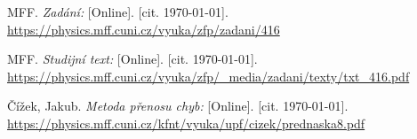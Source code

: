 
\begin{thebibliography}{9}

 MFF. \emph{Zadání:} [Online]. [cit. \today]. \newline \url{https://physics.mff.cuni.cz/vyuka/zfp/zadani/416}

 MFF. \emph{Studijní text:} [Online]. [cit. \today]. \newline \url{https://physics.mff.cuni.cz/vyuka/zfp/_media/zadani/texty/txt_416.pdf}

 Čížek, Jakub. \emph{Metoda přenosu chyb:} [Online]. [cit. \today]. \newline \url{https://physics.mff.cuni.cz/kfnt/vyuka/upf/cizek/prednaska8.pdf}

\end{thebibliography}
